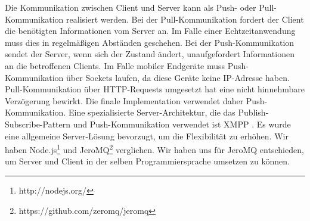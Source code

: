 Die Kommunikation zwischen Client und Server kann als Push- oder Pull-Kommunikation realisiert werden. 
Bei der Pull-Kommunikation fordert der Client die benötigten Informationen vom Server an. Im Falle einer Echtzeitanwendung muss dies in regelmäßigen Abständen geschehen.
Bei der Push-Kommunikation sendet der Server, wenn sich der Zustand ändert, unaufgefordert Informationen an die betroffenen Clients.
Im Falle mobiler Endgeräte muss Push-Kommunikation über Sockets laufen, da diese Geräte keine IP-Adresse haben.
Pull-Kommunikation über HTTP-Requests umgesetzt hat eine nicht hinnehmbare Verzögerung bewirkt.
Die finale Implementation verwendet daher Push-Kommunikation. Eine spezialisierte Server-Architektur, die das Publish-Subscribe-Pattern und Push-Kommunikation verwendet ist XMPP \cite{XMPP}. Es wurde eine allgemeine Server-Lösung bevorzugt, um die Flexibilität zu erhöhen. Wir haben Node.js\footnote{http://nodejs.org/} und JeroMQ\footnote{https://github.com/zeromq/jeromq} verglichen. Wir haben uns für JeroMQ entschieden, um Server und Client in der selben Programmiersprache umsetzen zu können.
